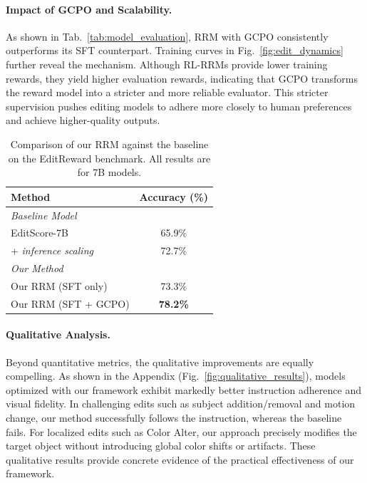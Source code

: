 \paragraph{Impact of GCPO and Scalability.} 
As shown in Tab.~\ref{tab:model_evaluation}, RRM with GCPO consistently outperforms its SFT counterpart. Training curves in Fig.~\ref{fig:edit_dynamics} further reveal the mechanism. Although RL-RRMs provide lower training rewards, they yield higher evaluation rewards, indicating that GCPO transforms the reward model into a stricter and more reliable evaluator. This stricter supervision pushes editing models to adhere more closely to human preferences and achieve higher-quality outputs.
\begin{table}[t!]
    \centering
    \caption{Comparison of our RRM against the baseline on the EditReward benchmark. All results are for 7B models.}
    \label{tab:editscore_benchmark_comparison}
    \renewcommand{\arraystretch}{1.15}
    \small
    \begin{tabular}{lc}
        \toprule
        \textbf{Method} & \textbf{Accuracy (\%)} \\
        \midrule
        \multicolumn{2}{l}{\textit{Baseline Model}} \\
        EditScore-7B & 65.9\% \\
        \quad + \textit{inference scaling} & 72.7\% \\
        \midrule
        \multicolumn{2}{l}{\textit{Our Method}} \\
        Our RRM (SFT only) & 73.3\% \\
        Our RRM (SFT + GCPO) & \textbf{78.2\%} \\
        \bottomrule
    \end{tabular}
\end{table}
\paragraph{Qualitative Analysis.} 
Beyond quantitative metrics, the qualitative improvements are equally compelling. As shown in the Appendix (Fig.~\ref{fig:qualitative_results}), models optimized with our framework exhibit markedly better instruction adherence and visual fidelity. 
In challenging edits such as subject addition/removal and motion change, our method successfully follows the instruction, whereas the baseline fails. For localized edits such as Color Alter, our approach precisely modifies the target object without introducing global color shifts or artifacts. These qualitative results provide concrete evidence of the practical effectiveness of our framework.

